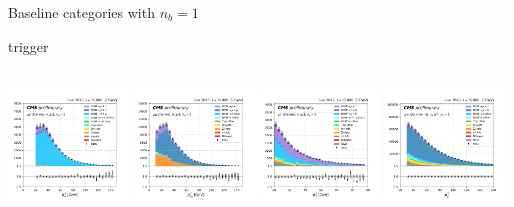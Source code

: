\begin{frame}{}
    Baseline categories with $n_b=1$
    \begin{block}{\smaller \PGm trigger}
    \begin{center}
        \centering
        \cme \qquad\qquad\qquad\quad \cmm \qquad\qquad\qquad\quad \cmt \qquad\qquad\qquad\quad \cmh \\
        \includegraphics[width=0.24\textwidth]{chapters/Analysis/sectionPlots/figures/kinematics_pickles/emu/1b/emu_1b_lepton2_pt.pdf}
        \includegraphics[width=0.24\textwidth]{chapters/Analysis/sectionPlots/figures/kinematics_pickles/mumu/1b/mumu_1b_lepton2_pt.pdf}
        \includegraphics[width=0.24\textwidth]{chapters/Analysis/sectionPlots/figures/kinematics_pickles/mutau/1b/mutau_1b_lepton2_pt.pdf}
        \includegraphics[width=0.24\textwidth]{chapters/Analysis/sectionPlots/figures/kinematics_pickles/mu4j/1b/mu4j_1b_lepton1_pt.pdf}
    \end{center}
    \end{block}
    

\end{frame}
